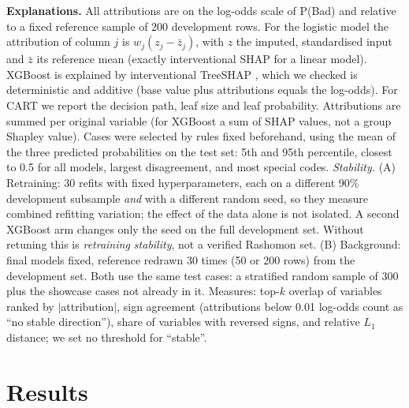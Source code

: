 \documentclass[11pt,a4paper]{article}
\begin{document}
\textbf{Explanations.} All attributions are on the log-odds scale of P(Bad) and relative to a fixed reference sample of 200 development rows. For the logistic model the attribution of column $j$ is $w_j(z_j-\bar z_j)$, with $z$ the imputed, standardised input and $\bar z$ its reference mean (exactly interventional SHAP for a linear model). XGBoost is explained by interventional TreeSHAP \cite{lundberg2017unified,lundberg2020local}, which we checked is deterministic and additive (base value plus attributions equals the log-odds). For CART we report the decision path, leaf size and leaf probability. Attributions are summed per original variable (for XGBoost a sum of SHAP values, not a group Shapley value). Cases were selected by rules fixed beforehand, using the mean of the three predicted probabilities on the test set: 5th and 95th percentile, closest to 0.5 for all models, largest disagreement, and most special codes. \emph{Stability.} (A) Retraining: 30 refits with fixed hyperparameters, each on a different 90\% development subsample \emph{and} with a different random seed, so they measure combined refitting variation; the effect of the data alone is not isolated. A second XGBoost arm changes only the seed on the full development set. Without retuning this is \emph{retraining stability}, not a verified Rashomon set. (B) Background: final models fixed, reference redrawn 30 times (50 or 200 rows) from the development set. Both use the same \NEval{} test cases: a stratified random sample of 300 plus the showcase cases not already in it. Measures: top-$k$ overlap of variables ranked by $|$attribution$|$, sign agreement (attributions below 0.01 log-odds count as ``no stable direction''), share of variables with reversed signs, and relative $L_1$ distance; we set no threshold for ``stable''.

\section{Results}\label{sec:results}
\begin{table}[htbp]
\centering\small
\caption{Predictive performance and structure. CV: mean over the 5 development folds for the selected configuration. Repeated: mean\,$\pm$\,s.d.\ over \NRepeats{} development splits with re-tuning. Test: final test set ($n=\NTest$) with 95\% paired-bootstrap intervals. Slope: logistic recalibration slope on test (1 = ideal).}
\label{tab:pred}

\vspace{-2mm}
\end{table}
\end{document}

